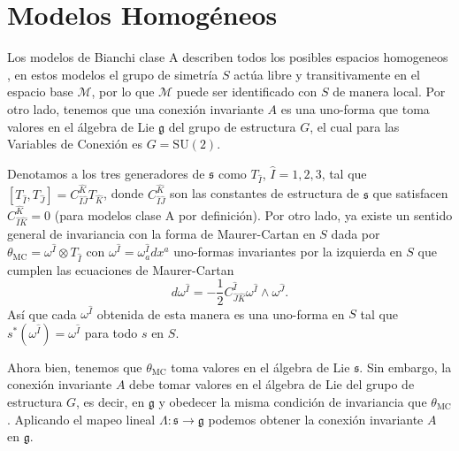 \section{Modelos Homog\'{e}neos}

Los modelos de Bianchi clase A describen todos los posibles espacios homogeneos \cite{Wald}, en estos modelos el grupo de simetr\'{i}a $S$ act\'{u}a libre y transitivamente en el espacio base $\mathcal{M}$, por lo que $\mathcal{M}$ puede ser identificado con $S$ de manera local. Por otro lado, tenemos que una conexi\'{o}n invariante $A$ es una uno-forma que toma valores en el \'{a}lgebra de Lie $\mathfrak{g}$ del grupo de estructura $G$, el cual para las Variables de Conexi\'{o}n es $G=\mathrm{SU}(2)$.

Denotamos a los tres generadores de $\mathfrak{s}$ como $T_{\hat{I}}$, $\hat{I}=1,2,3$, tal que $\left[ T_{\hat{I}}, T_{\hat{J}} \right] = C^{\hat{K}}_{\hat{I}\hat{J}} T_{\hat{K}}$, donde $C^{\hat{K}}_{\hat{I}\hat{J}}$ son las constantes de estructura de $\mathfrak{s}$ que satisfacen $C^{\hat{K}}_{\hat{I}\hat{K}} = 0$ (para modelos clase A por definici\'{o}n). Por otro lado, ya existe un sentido general de invariancia con la forma de Maurer-Cartan en $S$ dada por $\theta_{\mathrm{MC}} = \omega^{\hat{I}} \otimes T_{\hat{I}}$ con $\omega^{\hat{I}} = \omega^{\hat{I}}_{a} dx^{a}$ uno-formas invariantes por la izquierda en $S$ que cumplen las ecuaciones de Maurer-Cartan
%
\begin{equation}
d \omega^{\hat{I}} = -\frac{1}{2} C^{\hat{I}}_{\hat{J} \hat{K}} \omega^{\hat{I}} \wedge \omega^{\hat{J}}.
\end{equation}
%
As\'{i} que cada $\omega^{\hat{I}}$ obtenida de esta manera es una uno-forma en $S$ tal que $s^{*}(\omega^{\hat{I}}) = \omega^{\hat{I}}$ para todo $s$ en $S$.

Ahora bien, tenemos que $\theta_{\mathrm{MC}}$ toma valores en el \'{a}lgebra de Lie $\mathfrak{s}$. Sin embargo, la conexi\'{o}n invariante $A$ debe tomar valores en el \'{a}lgebra de Lie del grupo de estructura $G$, es decir, en $\mathfrak{g}$ y obedecer la misma condici\'{o}n de invariancia que $\theta_{\mathrm{MC}}$. Aplicando el mapeo lineal $\Lambda: \mathfrak{s} \longrightarrow \mathfrak{g}$ podemos obtener la conexi\'{o}n invariante $A$ en $\mathfrak{g}$.

